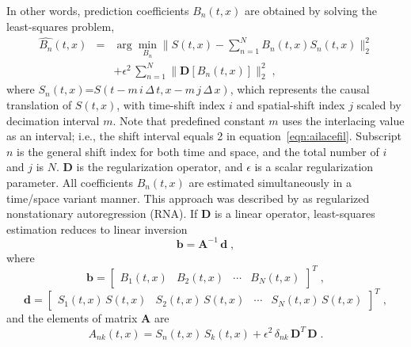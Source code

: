 In other words, prediction coefficients $B_n(t,x)$ are
obtained by solving the least-squares problem,
\begin{eqnarray}
  \label{eq:pred2}
\widehat{B_n}(t,x) &=& \arg\min_{B_n}\|S(t,x)-\sum_{n=1}^{N} 
   B_n(t,x)S_n(t,x)\|_2^2 \nonumber \\
  & & + \epsilon^2\, \sum_{n=1}^{N} \|\mathbf{D}[B_n(t,x)]\|_2^2\;,
\end{eqnarray}
where $S_n(t,x)$=$S(t-m\,i\,\Delta\,t,x-m\,j\,\Delta\,x)$, which
represents the causal translation of $S(t,x)$, with time-shift index
$i$ and spatial-shift index $j$ scaled by decimation interval
$m$. Note that predefined constant $m$ uses the interlacing value as
an interval; i.e., the shift interval equals 2 in
equation~\ref{eqn:ailacefil}. Subscript $n$ is the general shift index
for both time and space, and the total number of $i$ and $j$ is
$N$. $\mathbf{D}$ is the regularization operator, and $\epsilon$ is a
scalar regularization parameter.  All coefficients $B_n(t,x)$ are
estimated simultaneously in a time/space variant manner. This approach
was described by \cite{Fomel09} as regularized nonstationary
autoregression (RNA). If $\mathbf{D}$ is a linear operator,
least-squares estimation reduces to linear inversion
\begin{equation}
  \label{eq:inv}
  \mathbf{b} = \mathbf{A}^{-1}\,\mathbf{d}\;,
\end{equation}
where 
\begin{equation}
  \label{eq:bvar}
  \mathbf{b} = \left[\begin{array}{cccc}B_1(t,x) & B_2(t,x) & \cdots & B_N(t,x)\end{array}\right]^T\;,
\end{equation}
\begin{equation}
  \label{eq:dvar}
\mathbf{d} = \left[\begin{array}{cccc}S_1(t,x)\,S(t,x) & S_2(t,x)\,S(t,x) & \cdots & S_N(t,x)\,S(t,x)\end{array}\right]^T\;,
\end{equation}
and the elements of matrix $\mathbf{A}$ are
\begin{equation}
  \label{eq:aij}
  A_{nk}(t,x) = S_n(t,x)\,S_k(t,x) + \epsilon^2\,\delta_{nk}\,\mathbf{D}^T\,\mathbf{D}\;.
\end{equation}

